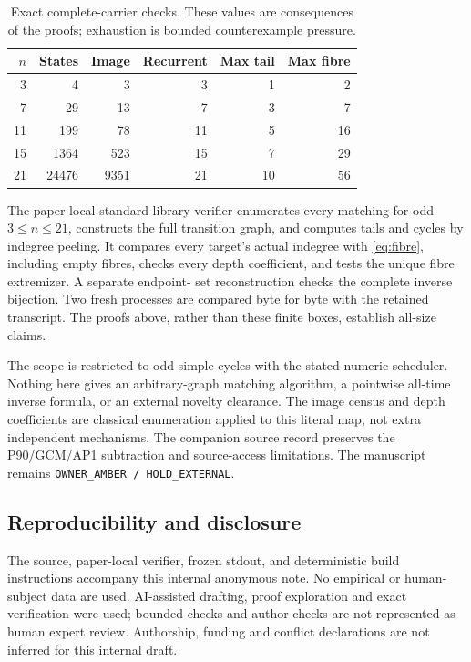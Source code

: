 \documentclass[a4paper,10pt]{amsart}
\theoremstyle{remark}
\begin{document}
\begin{table}[ht]
\centering
\caption{Exact complete-carrier checks. These values are consequences of
the proofs; exhaustion is bounded counterexample pressure.}
\begin{tabular}{rrrrrr}
\toprule
$n$ & States & Image & Recurrent & Max tail & Max fibre\\
\midrule
3 & 4 & 3 & 3 & 1 & 2\\
7 & 29 & 13 & 7 & 3 & 7\\
11 & 199 & 78 & 11 & 5 & 16\\
15 & 1364 & 523 & 15 & 7 & 29\\
21 & 24476 & 9351 & 21 & 10 & 56\\
\bottomrule
\end{tabular}
\end{table}

The paper-local standard-library verifier enumerates every matching for
odd $3\le n\le21$, constructs the full transition graph, and computes
tails and cycles by indegree peeling. It compares every target's actual
indegree with \eqref{eq:fibre}, including empty fibres, checks every depth
coefficient, and tests the unique fibre extremizer. A separate endpoint-
set reconstruction checks the complete inverse bijection. Two fresh
processes are compared byte for byte with the retained transcript.
The proofs above, rather than these finite boxes, establish all-size claims.

The scope is restricted to odd simple cycles with the stated numeric
scheduler. Nothing here gives an arbitrary-graph matching algorithm, a
pointwise all-time inverse formula, or an external novelty clearance.
The image census and depth coefficients are classical enumeration applied
to this literal map, not extra independent mechanisms. The companion
source record preserves the P90/GCM/AP1 subtraction and source-access
limitations. The manuscript remains \texttt{OWNER\_AMBER / HOLD\_EXTERNAL}.

\subsection*{Reproducibility and disclosure}
The source, paper-local verifier, frozen stdout, and deterministic build
instructions accompany this internal anonymous note. No empirical or
human-subject data are used. AI-assisted drafting, proof exploration and
exact verification were used; bounded checks and author checks are not
represented as human expert review. Authorship, funding and conflict
declarations are not inferred for this internal draft.


\end{document}
